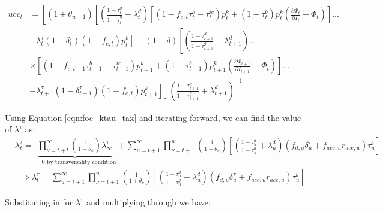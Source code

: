 \begin{equation}
\begin{split}
ucc_{t} &=  \left[\left({1+\theta_{u+1}}\right)\left[\left(\frac{1-\tau^{d}_{t}}{1-\tau^{g}_{t}} + \lambda^{d}_{t}\right)\left[(1-f_{e,t}\tau^{b}_{t}-\tau^{ic}_{t})p^{k}_{t}+ (1-\tau^{b}_{t})p^{k}_{t}\left(\frac{\partial \Phi_{t}}{\partial I_{t}} + \Phi_{t}\right)\right]... \right.\right. \\
& \left.\left. -\lambda^{\tau}_{t}(1-\delta^{\tau}_{t})(1-f_{e,t})p^{k}_{t}\right] - (1-\delta)\left[\left(\frac{1-\tau^{d}_{t+1}}{1-\tau^{g}_{t+1}} + \lambda^{d}_{t+1}\right)... \right.\right. \\
& \left.\left. \times \left[(1-f_{e,t+1}\tau^{b}_{t+1}-\tau^{ic}_{t+1})p^{k}_{t+1}+ (1-\tau^{b}_{t+1})p^{k}_{t+1}\left(\frac{\partial \Phi_{t+1}}{\partial I_{t+1}} + \Phi_{t}\right)\right]... \right.\right. \\
& \left.\left. -\lambda^{\tau}_{t+1}(1-\delta^{\tau}_{t+1})(1-f_{e,t})p^{k}_{t+1}\right]\right] \left(\frac{1-\tau^{d}_{t+1}}{1-\tau^{g}_{t+1}} + \lambda^{d}_{t+1} \right)^{-1}
\end{split}
\end{equation}


Using Equation \ref{eqn:foc_ktau_tax} and iterating forward, we can find the value of $\lambda^{\tau}$ as:
\begin{equation}
\begin{split}
& \lambda^{\tau}_{t}=\underbrace{\prod_{\nu=t+!}^{\infty}\left(\frac{1}{1+\theta_{\nu}}\right)\lambda^{\tau}_{\infty}}_{=0 \text{ by transversality condition}} + \sum_{u=t+1}^{\infty} \prod_{\nu=t+1}^{u}\left(\frac{1}{1+\theta_{\nu}}\right)\left[\left(\frac{1-\tau^{d}_{u}}{1-\tau^{g}_{u}}+\lambda^{d}_{u}\right)\left( f_{d,u}\delta^{\tau}_{u}+f_{ace,u}r_{ace,u} \right)\tau^{b}_{u}\right]\\
&\implies  \lambda^{\tau}_{t}= \sum_{u=t+1}^{\infty} \prod_{\nu=t+1}^{u}\left(\frac{1}{1+\theta_{\nu}}\right)\left[\left(\frac{1-\tau^{d}_{u}}{1-\tau^{g}_{u}}+\lambda^{d}_{u}\right)\left( f_{d,u}\delta^{\tau}_{u}+f_{ace,u}r_{ace,u} \right)\tau^{b}_{u}\right]
\end{split}
\end{equation}

Substituting in for $\lambda^{\tau}$ and multiplying through we have:

